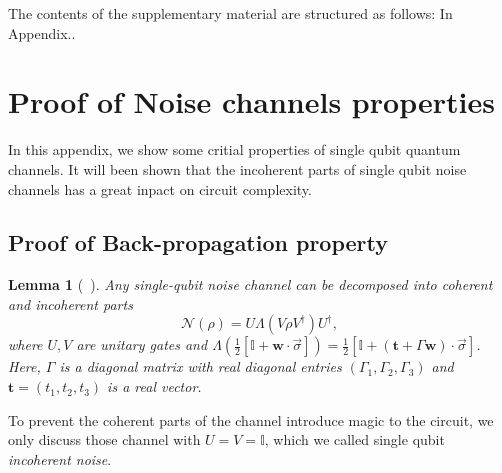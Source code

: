 \documentclass[aps,%
twocolumn,%
floatfix,%
pra,%
amsfonts,%
longbibliography,%
groupedaddress,%
superscriptaddress]{revtex4-2}%
\newtheorem{lemma}{Lemma}
\newcommand{\1}{\mathbbm{1}}
\begin{document}
\setcounter{secnumdepth}{2}
\appendix
\widetext
\newpage

\appendixmaketitle
\vspace{0.2in}

The contents of the supplementary material are structured as follows: 
In Appendix..

\section{Proof of Noise channels properties}
\label{app:proof_nosie_channel}
In this appendix, we show some critial properties of single qubit quantum channels. It will been shown that the incoherent parts of single qubit noise channels has a great inpact on circuit complexity.
\subsection{Proof of Back-propagation property}
\begin{lemma}[~\cite{ruskai2002analysis}]
    Any single-qubit noise channel can be decomposed into coherent and incoherent parts
\[
\mathcal{N}(\rho) = U \Lambda(V \rho V^\dagger)U^\dagger,
\]
where $U,V$ are unitary gates and  \(\Lambda\left(\frac{1}{2}[\mathbb{I} + \mathbf{w} \cdot \vec \sigma]\right) = \frac{1}{2}[\mathbb{I} + (\mathbf{t} + \Gamma\mathbf{w}) \cdot  \vec\sigma]\). Here, \(\Gamma\) is a diagonal matrix with real diagonal entries $(\Gamma_1,\Gamma_2,\Gamma_3)$ and $\mathbf{t} = (t_1,t_2,t_3)$ is a real vector. 
\end{lemma}
To prevent the coherent parts of the channel introduce magic to the circuit, we only discuss those channel with $U = V = \mathbb{I}$, which we called single qubit \textit{incoherent noise}.
\end{document}
